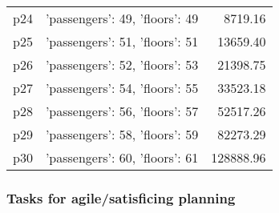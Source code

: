 \documentclass{article}
\begin{document}
\begin{center}
\begin{tabular}{@{}l|r|r@{}}
  p24&{'passengers': 49, 'floors': 49}&8719.16\\
  p25&{'passengers': 51, 'floors': 51}&13659.40\\
  p26&{'passengers': 52, 'floors': 53}&21398.75\\
  p27&{'passengers': 54, 'floors': 55}&33523.18\\
  p28&{'passengers': 56, 'floors': 57}&52517.26\\
  p29&{'passengers': 58, 'floors': 59}&82273.29\\
  p30&{'passengers': 60, 'floors': 61}&128888.96
                            \end{tabular}
                            \end{center}
                    

                                \subsubsection*{Tasks for agile/satisficing planning}
                                
\end{document}
